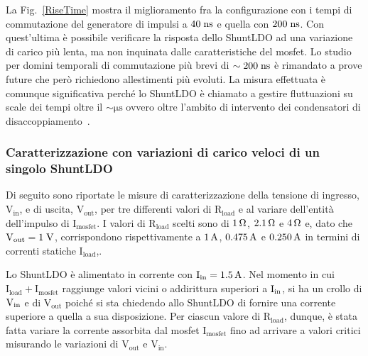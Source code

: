 La Fig.~\ref{RiseTime} mostra il miglioramento fra la configurazione con i tempi di commutazione del generatore di impulsi a $40 \rm \; ns$ e quella con $200 \rm \; ns$. Con quest'ultima è possibile verificare la risposta dello ShuntLDO ad una variazione di carico più lenta, ma non inquinata dalle caratteristiche del mosfet. Lo studio per domini temporali di commutazione pi\`u brevi di $\sim 200\rm \; ns$ \`e rimandato a prove future che per\`o richiedono allestimenti pi\`u evoluti. La misura effettuata \`e comunque significativa perch\'e lo ShuntLDO \`e chiamato a gestire fluttuazioni su scale dei tempi oltre il $\sim \mathrm{\mu s}$ ovvero oltre l'ambito di intervento dei condensatori di disaccoppiamento~\cite{saramarconi}.
 

\subsubsection{Caratterizzazione con variazioni di carico veloci di un singolo ShuntLDO}

Di seguito sono riportate le misure di caratterizzazione della tensione di ingresso, $\mathrm{V_{in}}$, e di uscita, $\mathrm{V_{out}}$, per tre differenti valori di $\mathrm{R_{load}}$ e al variare dell'entit\`a dell'impulso di $\mathrm{I_{mosfet}}$.
I valori di $\mathrm{R_{load}}$ scelti sono di $1{\rm \, \Omega}$, $2.1{\rm \, \Omega}$ e $4{\rm \, \Omega}$ e, dato che $\mathrm{V_{out}=1\rm \; V}$, corrispondono rispettivamente a $1\rm \, A$, $0.475\rm \, A$ e $0.250\rm \, A$ in termini di correnti statiche $\mathrm{I_{load}}$,.

Lo ShuntLDO è alimentato in corrente con $\mathrm{I_{in}} = 1.5\rm \, A$. Nel momento in cui $\mathrm{I_{load}+I_{mosfet}}$ raggiunge valori vicini o addirittura superiori  a $\mathrm{I_{in}}$, si ha un crollo di $\mathrm{V_{in}}$ e di $\mathrm{V_{out}}$ poiché si sta chiedendo allo ShuntLDO di fornire una corrente superiore a quella a sua disposizione.
Per ciascun valore di $\mathrm{R_{load}}$, dunque, è stata fatta variare la corrente assorbita dal mosfet $\mathrm{I_{mosfet}}$ fino ad arrivare a valori critici misurando le variazioni di $\mathrm{V_{out}}$ e $\mathrm{V_{in}}$. 


